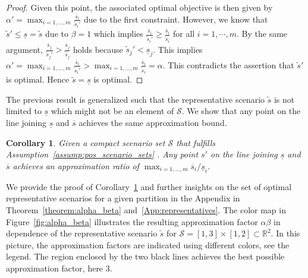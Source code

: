 \documentclass{article}
\newtheorem{corollary}[theorem]{Corollary}
\newcommand{\mS}{\mathcal{S}}
\newcommand{\R}{\mathbb{R}}
\begin{document}
\begin{proof}
Given this point, the associated optimal objective is then given by \(\alpha' = \max_{i=1,\dots,m}\frac{\overline{s}_i}{\tilde{s}_i'}\) due to the first constraint.
However, we know that \(\tilde{s}' \leq \underline{s} = \tilde{s}\) due to $\beta=1$ which implies \(\frac{\overline{s}_i}{\tilde{s}_i'} \geq \frac{\overline{s}_i}{\tilde{s}_i}\) for all $i=1,\cdots,m$.
By the same argument, \(\frac{\overline{s}_j}{\tilde{s}_j'} > \frac{\overline{s}_j}{\tilde{s}_j}\) holds because \(\tilde{s}_j' < \underline{s}_j\).
This implies \(\alpha' = \max_{i=1,\dots,m}\frac{\overline{s}_i}{\tilde{s}_i'} > \max_{i=1,\dots,m}\frac{\overline{s}_i}{\tilde{s}_i} = \alpha\).
This contradicts the assertion that \(\tilde{s}'\) is optimal.
Hence \(\tilde{s} = \underline{s}\) is optimal.
\end{proof}

The previous result is generalized such that the representative scenario \(\tilde{s}\) is not limited to \(\underline{s}\) which might not be an element of $\mS$.
We show that any point on the line joining \(\underline{s}\) and \(\overline{s}\) achieves the same approximation bound. 

\begin{corollary}\label{coro:diagonale}
	Given a compact scenario set $\mS$ that fulfills Assumption~\ref{assump:pos_scenario_sets} .  Any point \(s'\) on the line joining \(\underline{s}\) and \(\overline{s}\) achieves an approximation ratio of $\max_{i=1,\dots,m} {\overline{s}_i}/{\underline{s}_i}$.
\end{corollary}
We provide the proof of Corollary~\ref{coro:diagonale} and further insights on the set of optimal representative scenarios for a given partition in the Appendix in Theorem~\ref{theorem:alpha_beta} and~\ref{App:representatives}.
The color map in Figure~\ref{fig:alpha_beta} illustrates the resulting approximation factor $\alpha\beta$ in dependence of the representative scenario $\tilde{s}$ for $\mS=[1,3] \times [1,2] \subset \R^2$.
In this picture, the approximation factors are indicated using
different colors, see the legend.
The region enclosed by the two black lines achieves the best possible approximation factor, here 3.

\end{document}
